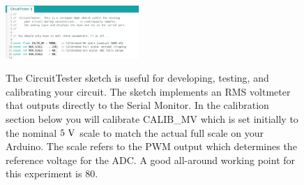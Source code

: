\documentclass[12pt]{article}
\begin{document}
\begin{figure}[htbp]
\begin{center}
{\includegraphics[width=0.45\textwidth]{figs/test_circuit.png}}\\
\end{center}
\caption{\label{fig:sketches}  The CircuitTester sketch is useful for developing, testing, and calibrating your circuit.  The sketch implements an RMS voltmeter that outputs directly to the Serial Monitor.  In the calibration section below you will calibrate CALIB\_MV which is set initially to the nominal $5~\rm V$ scale to match the actual full scale on your Arduino.  The scale refers to the PWM output which determines the reference voltage for the ADC.  A good all-around working point for this experiment is 80.}
\end{figure}
\end{document}
